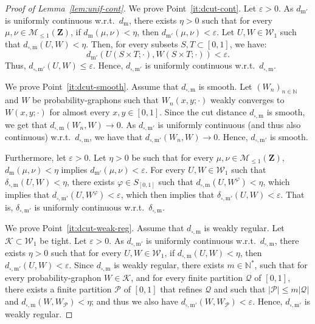 \documentclass{amsart}
\newcommand{\wrt}{w.r.t.\ }
\theoremstyle{plain}
\theoremstyle{definition}
\newcommand{\Space}{\mathbf{Z}}
\newcommand{\cP}{\mathcal{P}}
\newcommand{\cQ}{\mathcal{Q}}
\newcommand{\SubProba}{\mathcal{M}_{\leq1}(\Space)}
\newcommand{\Graphon}{\mathcal{W}_1}
\newcommand{\InvRelabel}{S_{[0,1]}}
\newcommand{\m}{\mathrm{m}}
\newcommand{\dmeas}{d_\m}
\newcommand{\dcut}{d_{\square,\m}}
\newcommand{\ddcut}{\delta_{\square,\m}}
\newcommand{\mPrime}{\mathrm{m'}}
\newcommand{\dmeasPrime}{d_{\mPrime}}
\newcommand{\dcutPrime}{d_{\square,\mPrime}}
\newcommand{\ddcutPrime}{\delta_{\square,\mPrime}}
\newcommand{\N}{\mathbb{N}}
\newcommand{\eps}{\varepsilon}
\begin{document}
\begin{proof}[Proof of Lemma~\ref{lem:unif-cont}]
  We prove Point~\ref{it:dcut-cont}.  Let  $\eps > 0$.  As $\dmeasPrime$
  is uniformly continuous \wrt $\dmeas$, there exists $\eta > 0$ such
  that for every $\mu, \nu\in \SubProba$, if $\dmeas(\mu,\nu) < \eta$,
  then $\dmeasPrime(\mu,\nu)  < \eps$.  Let $U,W\in  \Graphon$ such that
  $\dcut(U,W)  <  \eta$.   Then, for every
  subsets $S,T \subset [0,1]$, we have:
\[
  \dmeasPrime\left(  U(S\times T;\cdot), 
    W(S\times T;\cdot) \right)
  < \eps .
\]
Thus, $\dcutPrime(U,W) \leq \eps$.
Hence, $\dcutPrime$ is uniformly continuous \wrt $\dcut$.

\medskip

We prove  Point~\ref{it:dcut-smooth}.  Assume  that $\dcut$  is smooth.
Let  $(W_n )_{n\in\N}$  and $W$  be probability-graphons such  that
$W_n(x,y;\cdot)$  weakly converges  to $W(x,y;\cdot)$  for almost  every
$x,y\in [0,1]$.  Since  the cut distance $\dcut$ is smooth,  we get that
$\dcut(W_n, W)  \to 0$.  As  $\dcutPrime$ is uniformly  continuous 
(and     thus    also     continuous)  \wrt  $\dcut$,    we     have    that
$\dcutPrime(W_n, W) \to 0$.  Hence, $\dcutPrime$ is smooth.

Furthermore, let $\eps > 0$.
Let $\eta > 0$ be such that for every $\mu,\nu\in\SubProba$,
	$\dmeas(\mu,\nu) < \eta$ implies $\dmeasPrime(\mu,\nu) < \eps$.
For every $U,W\in\Graphon$ such that $\ddcut(U,W) < \eta$,
	there exists $\varphi\in\InvRelabel$ such that $\dcut(U, W^\varphi) < \eta$,
	which implies that  $\dcutPrime(U, W^\varphi) < \eps$,
	which then implies that $\ddcutPrime(U,W) < \eps$.
That is, $\ddcutPrime$ is uniformly continuous \wrt $\ddcut$.
\medskip

We prove  Point~\ref{it:dcut-weak-reg}.  Assume that $\dcut$  is weakly
regular.  Let $\mathcal{K}\subset  \Graphon$ be tight.  Let  $\eps > 0$.
As  $\dcutPrime$ is  uniformly  continuous \wrt  $\dcut$, there  exists
$\eta   >   0$   such   that   for   every   $U,W\in   \Graphon$,   if
$\dcut(U,W) < \eta$, then $\dcutPrime(U,W) < \eps$.  Since $\dcut$ is
weakly   regular,  there   exists  $m\in\N^*$,   such  that   for  every
probability-graphon  $W\in\mathcal{K}$,   and  for  every  finite partition
$\mathcal{Q}$  of $[0,1]$,  there  exists a  finite partition $\mathcal{P}$  of
$[0,1]$ that refines $\mathcal{Q}$ and such that
$\vert \cP \vert \leq m \vert\cQ\vert$ and
$\dcut(W,   W_{\mathcal{P}})  <   \eta$;   and  thus   we  also   have
$\dcutPrime(W, W_{\mathcal{P}}) < \eps$.   Hence, $\dcutPrime$ is weakly
regular.


\end{proof}
\end{document}
